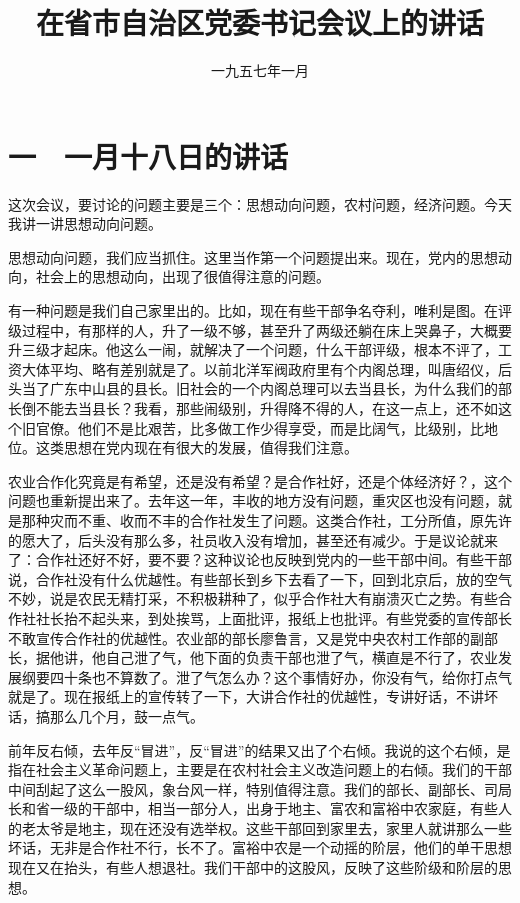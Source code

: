 
\title{在省市自治区党委书记会议上的讲话}
\date{一九五七年一月}
\maketitle


\section{一　一月十八日的讲话}

这次会议，要讨论的问题主要是三个：思想动向问题，农村问题，经济问题。今天我讲一讲思想动向问题。

思想动向问题，我们应当抓住。这里当作第一个问题提出来。现在，党内的思想动向，社会上的思想动向，出现了很值得注意的问题。

有一种问题是我们自己家里出的。比如，现在有些干部争名夺利，唯利是图。在评级过程中，有那样的人，升了一级不够，甚至升了两级还躺在床上哭鼻子，大概要升三级才起床。他这么一闹，就解决了一个问题，什么干部评级，根本不评了，工资大体平均、略有差别就是了。以前北洋军阀政府里有个内阁总理，叫唐绍仪，后头当了广东中山县的县长。旧社会的一个内阁总理可以去当县长，为什么我们的部长倒不能去当县长？我看，那些闹级别，升得降不得的人，在这一点上，还不如这个旧官僚。他们不是比艰苦，比多做工作少得享受，而是比阔气，比级别，比地位。这类思想在党内现在有很大的发展，值得我们注意。

农业合作化究竟是有希望，还是没有希望？是合作社好，还是个体经济好？，这个问题也重新提出来了。去年这一年，丰收的地方没有问题，重灾区也没有问题，就是那种灾而不重、收而不丰的合作社发生了问题。这类合作社，工分所值，原先许的愿大了，后头没有那么多，社员收入没有增加，甚至还有减少。于是议论就来了：合作社还好不好，要不要？这种议论也反映到党内的一些干部中间。有些干部说，合作社没有什么优越性。有些部长到乡下去看了一下，回到北京后，放的空气不妙，说是农民无精打采，不积极耕种了，似乎合作社大有崩溃灭亡之势。有些合作社社长抬不起头来，到处挨骂，上面批评，报纸上也批评。有些党委的宣传部长不敢宣传合作社的优越性。农业部的部长廖鲁言，又是党中央农村工作部的副部长，据他讲，他自己泄了气，他下面的负责干部也泄了气，横直是不行了，农业发展纲要四十条也不算数了。泄了气怎么办？这个事情好办，你没有气，给你打点气就是了。现在报纸上的宣传转了一下，大讲合作社的优越性，专讲好话，不讲坏话，搞那么几个月，鼓一点气。

前年反右倾，去年反“冒进”，反“冒进”的结果又出了个右倾。我说的这个右倾，是指在社会主义革命问题上，主要是在农村社会主义改造问题上的右倾。我们的干部中间刮起了这么一股风，象台风一样，特别值得注意。我们的部长、副部长、司局长和省一级的干部中，相当一部分人，出身于地主、富农和富裕中农家庭，有些人的老太爷是地主，现在还没有选举权。这些干部回到家里去，家里人就讲那么一些坏话，无非是合作社不行，长不了。富裕中农是一个动摇的阶层，他们的单干思想现在又在抬头，有些人想退社。我们干部中的这股风，反映了这些阶级和阶层的思想。

